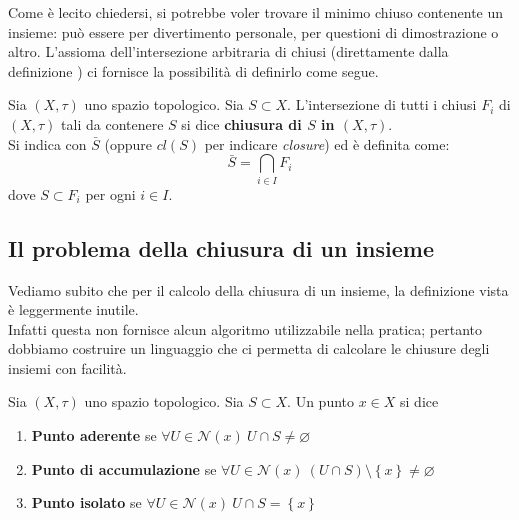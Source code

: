 Come è lecito chiedersi, si potrebbe voler trovare il minimo chiuso contenente un insieme: può essere per divertimento personale, per questioni di dimostrazione o altro. L'assioma dell'intersezione arbitraria di chiusi (direttamente dalla definizione
) ci fornisce la possibilità di definirlo come segue.
\begin{definition}
	Sia $(X, \tau)$ uno spazio topologico. Sia $S \subset X$. L'intersezione di tutti i chiusi $F_i$ di $(X,\tau)$ tali da contenere $S$ si dice \textbf{chiusura di $S$ in $(X, \tau)$}. \\ Si indica con $\bar{S}$ (oppure $cl(S)$ per indicare \textit{closure}) ed è definita come:
	\begin{equation*}
		\bar{S} = \bigcap_{i \in I} F_i
	\end{equation*}
	dove $S \subset F_i$ per ogni $i \in I$.
\end{definition}



\subsection{\textcolor{TopGener}{\textbf{Il problema della chiusura di un insieme}}}



Vediamo subito che per il calcolo della chiusura di un insieme, la definizione vista è leggermente inutile. \\ Infatti questa non fornisce alcun algoritmo utilizzabile nella pratica; pertanto dobbiamo costruire un linguaggio che ci permetta di calcolare le chiusure degli insiemi con facilità.
\begin{definition}
		Sia $(X, \tau)$ uno spazio topologico. Sia $S \subset X$. Un punto $x \in X$ si dice
	\begin{enumerate}
		\item \textbf{Punto aderente} se $\forall U \in \mathcal{N}(x)\ U \cap S \neq \varnothing$
		\item \textbf{Punto di accumulazione} se $\forall U \in \mathcal{N}(x)\ (U \cap S) \setminus \left\{x\right\} \neq \varnothing$
		\item \textbf{Punto isolato} se $\forall U \in \mathcal{N}(x)\ U \cap S = \left\{x\right\}$
	\end{enumerate}
\end{definition}

